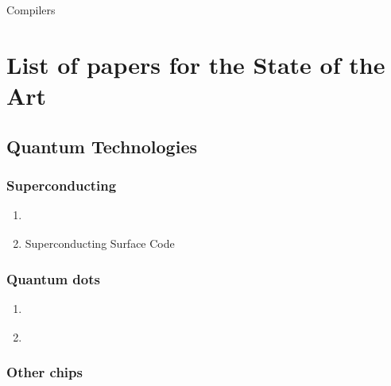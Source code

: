 \documentclass[11pt]{article}
\author{Daniel Moreno Manzano}
\date{\today}
\title{}
\begin{document}
\tableofcontents

Compilers




\section{List of papers for the State of the Art}
\label{sec:org8fdee5c}


\subsection{Quantum Technologies}
\label{sec:org4c4ff87}

\subsubsection{Superconducting}
\label{sec:org5819093}

\begin{enumerate}
\item \cite{Barends_2014}
\label{sec:org13a8523}

\item Superconducting Surface Code \cite{Versluis_2017}
\label{sec:orga6cf026}
\end{enumerate}

\subsubsection{Quantum dots}
\label{sec:org2a65393}

\begin{enumerate}
\item \cite{Hill_2015}
\label{sec:org792a4b2}

\item \cite{Li_2018}
\label{sec:orgd8c9b90}
\end{enumerate}

\subsubsection{Other chips}
\label{sec:org857882f}
\end{document}
